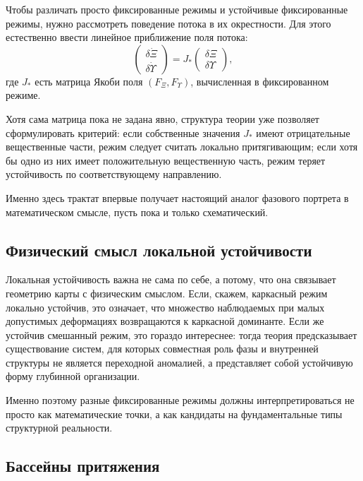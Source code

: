 \documentclass[12pt,a4paper]{article}
\begin{document}
Чтобы различать просто фиксированные режимы и устойчивые фиксированные режимы, нужно рассмотреть поведение потока в их окрестности. Для этого естественно ввести линейное приближение поля потока:
\begin{equation}
\begin{pmatrix}
\delta \dot{\Xi} \\
\delta \dot{\Upsilon}
\end{pmatrix}
=
J_*
\begin{pmatrix}
\delta \Xi \\
\delta \Upsilon
\end{pmatrix},
\end{equation}
где \(J_*\) есть матрица Якоби поля \((F_{\Xi},F_{\Upsilon})\), вычисленная в фиксированном режиме.

Хотя сама матрица пока не задана явно, структура теории уже позволяет сформулировать критерий: если собственные значения \(J_*\) имеют отрицательные вещественные части, режим следует считать локально притягивающим; если хотя бы одно из них имеет положительную вещественную часть, режим теряет устойчивость по соответствующему направлению.

Именно здесь трактат впервые получает настоящий аналог фазового портрета в математическом смысле, пусть пока и только схематический.

\subsection{Физический смысл локальной устойчивости}

Локальная устойчивость важна не сама по себе, а потому, что она связывает геометрию карты с физическим смыслом. Если, скажем, каркасный режим локально устойчив, это означает, что множество наблюдаемых при малых допустимых деформациях возвращаются к каркасной доминанте. Если же устойчив смешанный режим, это гораздо интереснее: тогда теория предсказывает существование систем, для которых совместная роль фазы и внутренней структуры не является переходной аномалией, а представляет собой устойчивую форму глубинной организации.

Именно поэтому разные фиксированные режимы должны интерпретироваться не просто как математические точки, а как кандидаты на фундаментальные типы структурной реальности.

\subsection{Бассейны притяжения}
\end{document}
